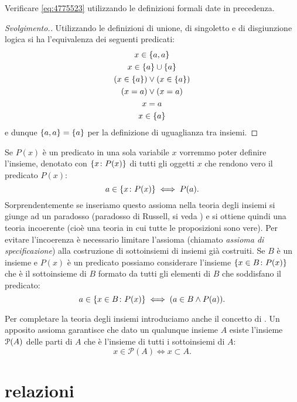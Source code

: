 \begin{exercise}
  Verificare \eqref{eq:4775523} utilizzando le definizioni formali date in precedenza.
\end{exercise}
\begin{proof}[Svolgimento.]
Utilizzando le definizioni di unione, di singoletto e di disgiunzione logica
si ha l'equivalenza dei seguenti
predicati:
\begin{gather*}
  x \in \ENCLOSE{a,a}  \\
  x \in \ENCLOSE{a} \cup \ENCLOSE{a}\\
  (x \in \ENCLOSE{a}) \lor (x \in \ENCLOSE{a})\\
  (x = a) \lor (x = a) \\
  x = a \\
  x \in \ENCLOSE{a}
\end{gather*}
e dunque $\ENCLOSE{a,a}=\ENCLOSE{a}$ per la definizione di uguaglianza tra insiemi.
\end{proof}

Se $P(x)$ è un predicato in una sola variabile $x$ vorremmo poter
definire l'insieme, denotato con $\ENCLOSE{x\colon P(x)}$
di tutti gli oggetti $x$ che rendono vero il predicato $P(x)$:
\[
  a \in \ENCLOSE{x\colon P(x)} \iff P(a).
\]
Sorprendentemente se inseriamo questo assioma nella teoria degli insiemi
si giunge ad un paradosso (paradosso di Russell, si veda \cite{appunti_logica})
e si ottiene quindi una teoria incoerente
(cioè una teoria in cui tutte le proposizioni sono vere). Per evitare
l'incoerenza è necessario limitare l'assioma (chiamato \emph{assioma di specificazione})
alla costruzione di sottoinsiemi di insiemi già costruiti.
Se $B$ è un insieme e $P(x)$ è un predicato possiamo considerare
l'insieme $\ENCLOSE{x\in B\colon P(x)}$ che è il sottoinsieme di
$B$ formato da tutti gli elementi di $B$
che soddisfano il predicato:
\[
  a \in \ENCLOSE{x\in B\colon P(x)} \iff (a \in B \land P(a)).
\]

Per completare la teoria degli insiemi introduciamo anche il concetto di
.
% 
\label{def:insieme_parti}%
Un apposito assioma garantisce
che dato un qualunque insieme $A$ esiste l'insieme $\P(A)$ delle parti di $A$
che è l'insieme di tutti i sottoinsiemi di $A$:
\begin{equation}\label{eq:insieme_delle_parti}
  x \in \mathcal P(A) \iff x \subset A.
\end{equation}

\section{relazioni}


